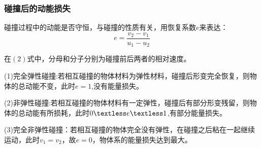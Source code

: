 \documentclass[UTF8]{article}
\begin{document}
	\subsubsection*{碰撞后的动能损失}
	\par 碰撞过程中的动能是否守恒，与碰撞的性质有关，用恢复系数$e$来表达：
	\begin{equation}
		e=\frac{v_2-v_1}{u_1-u_2}
	\end{equation}
	\par 在$(2)$式中，分母和分子分别为碰撞前后两者的相对速度。
	\par (1)完全弹性碰撞:若相互碰撞的物体材料为弹性材料，碰撞后形变完全恢复，则物体的总动能不变，此时$e=1$,没有能量损失。
	\par (2)非弹性碰撞:若相互碰撞的物体材料有一定弹性，碰撞后有部分形变残留，则物体的总动能有所损耗，此时$0\textless e\textless1$,有部分能量损失。
	\par (3)完全非弹性碰撞：若相互碰撞的物体完全没有弹性，在碰撞之后粘在一起继续运动，此时$v_1=v_2$，故$e=0$，物体系的能量损失达到最大。
\end{document}

